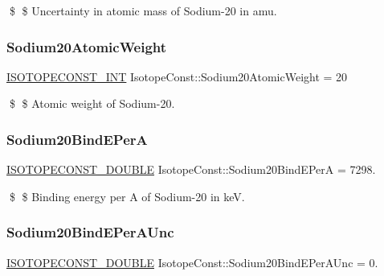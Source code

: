 \$ \$ Uncertainty in atomic mass of Sodium-\/20 in amu. \mbox{\label{group___isotope_const-_sodium-_na20_ga8a81d2b60aa5c43436d82ad48a7208cc}} 
\subsubsection{\texorpdfstring{Sodium20\+Atomic\+Weight}{Sodium20AtomicWeight}}
{\footnotesize\ttfamily \mbox{\hyperlink{group___isotope_const-_macros_ga5f18360b3e99483a35c32d789e62621c}{I\+S\+O\+T\+O\+P\+E\+C\+O\+N\+S\+T\+\_\+\+I\+NT}} Isotope\+Const\+::\+Sodium20\+Atomic\+Weight = 20}

\$ \$ Atomic weight of Sodium-\/20. \mbox{\label{group___isotope_const-_sodium-_na20_gab38ada6a85ceca537b1fb62dc8799309}} 
\subsubsection{\texorpdfstring{Sodium20\+Bind\+E\+PerA}{Sodium20BindEPerA}}
{\footnotesize\ttfamily \mbox{\hyperlink{group___isotope_const-_macros_ga8f45a7272ce02c0b4c65c44636ed719a}{I\+S\+O\+T\+O\+P\+E\+C\+O\+N\+S\+T\+\_\+\+D\+O\+U\+B\+LE}} Isotope\+Const\+::\+Sodium20\+Bind\+E\+PerA = 7298.}

\$ \$ Binding energy per A of Sodium-\/20 in keV. \mbox{\label{group___isotope_const-_sodium-_na20_ga8916150a1afada20c9a2f9dbe0757c50}} 
\subsubsection{\texorpdfstring{Sodium20\+Bind\+E\+Per\+A\+Unc}{Sodium20BindEPerAUnc}}
{\footnotesize\ttfamily \mbox{\hyperlink{group___isotope_const-_macros_ga8f45a7272ce02c0b4c65c44636ed719a}{I\+S\+O\+T\+O\+P\+E\+C\+O\+N\+S\+T\+\_\+\+D\+O\+U\+B\+LE}} Isotope\+Const\+::\+Sodium20\+Bind\+E\+Per\+A\+Unc = 0.}

